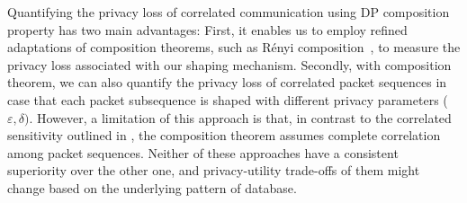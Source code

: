 Quantifying the privacy loss of correlated communication using DP composition property has two main advantages: 
First, it enables us to employ refined adaptations of composition theorems, such as R\'enyi composition~\cite{mironov2017renyi}, to measure the privacy loss associated with our shaping mechanism.
Secondly, with composition theorem, we can also quantify the privacy loss of correlated packet sequences in case that each packet subsequence is shaped with different privacy parameters ($\varepsilon, \delta)$.
However, a limitation of this approach is that, in contrast to the correlated sensitivity outlined in , the composition theorem assumes complete correlation among packet sequences.
Neither of these approaches have a consistent superiority over the other one, and privacy-utility trade-offs of them might change based on the underlying pattern of database.
